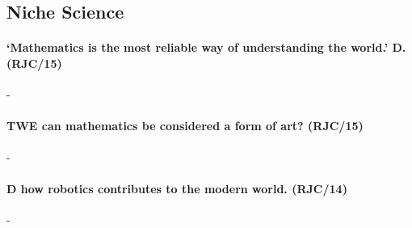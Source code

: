 \documentclass[../../main]{subfiles}
\begin{document}
\subsection{Niche Science}

\paragraph{`Mathematics is the most reliable way of understanding the world.' D. (RJC/15)}-

\paragraph{TWE can mathematics be considered a form of art? (RJC/15)}-

\paragraph{D how robotics contributes to the modern world. (RJC/14)}-
\end{document}
